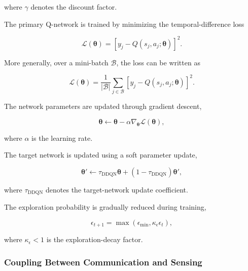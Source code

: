 where $\gamma$ denotes the discount factor.

The primary Q-network is trained by minimizing the temporal-difference
loss

\begin{equation}
\mathcal{L}
\left(
\boldsymbol{\theta}
\right)
=
\left[
y_j
-
Q
\left(
s_j,a_j;\boldsymbol{\theta}
\right)
\right]^2.
\label{eq:isac_ddqn_loss}
\end{equation}

More generally, over a mini-batch $\mathcal{B}$, the loss can be written as

\begin{equation}
\mathcal{L}
\left(
\boldsymbol{\theta}
\right)
=
\frac{1}{|\mathcal{B}|}
\sum_{j\in\mathcal{B}}
\left[
y_j
-
Q
\left(
s_j,a_j;\boldsymbol{\theta}
\right)
\right]^2.
\label{eq:isac_ddqn_batch_loss}
\end{equation}

The network parameters are updated through gradient descent,

\begin{equation}
\boldsymbol{\theta}
\leftarrow
\boldsymbol{\theta}
-
\alpha
\nabla_{\boldsymbol{\theta}}
\mathcal{L}
\left(
\boldsymbol{\theta}
\right),
\label{eq:isac_gradient_update}
\end{equation}

where $\alpha$ is the learning rate.

The target network is updated using a soft parameter update,

\begin{equation}
\boldsymbol{\theta}'
\leftarrow
\tau_{\mathrm{DDQN}}
\boldsymbol{\theta}
+
\left(
1-\tau_{\mathrm{DDQN}}
\right)
\boldsymbol{\theta}',
\label{eq:isac_soft_update}
\end{equation}

where $\tau_{\mathrm{DDQN}}$ denotes the target-network update coefficient.

The exploration probability is gradually reduced during training,

\begin{equation}
\epsilon_{t+1}
=
\max
\left(
\epsilon_{\min},
\kappa_{\epsilon}\epsilon_t
\right),
\label{eq:isac_epsilon_decay}
\end{equation}

where $\kappa_{\epsilon}<1$ is the exploration-decay factor.

\subsubsection{Coupling Between Communication and Sensing}

